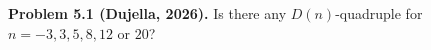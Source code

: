 \textbf{Problem 5.1 (Dujella, 2026).} Is there any $D(n)$-quadruple for $n = -3, 3, 5, 8, 12$ or $20$?
